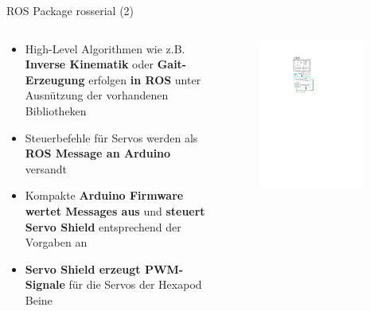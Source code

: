 \documentclass{beamer}
\begin{document}
\begin{frame}{ROS Package rosserial (2)}
\begin{columns}
\begin{column}{0.7\textwidth}
\begin{itemize}
	\item High-Level Algorithmen wie z.B. \textbf{Inverse Kinematik} oder \textbf{Gait-Erzeugung} erfolgen \textbf{in ROS} unter Ausn\"utzung der vorhandenen Bibliotheken
\end{itemize}
\begin{itemize}
	\item Steuerbefehle f\"ur Servos werden als \textbf{ROS Message an Arduino} versandt
\end{itemize}
\begin{itemize}
	\item Kompakte\textbf{ Arduino Firmware wertet Messages aus} und \textbf{steuert Servo Shield} entsprechend der Vorgaben an
\end{itemize}
\begin{itemize}
	\item \textbf{Servo Shield erzeugt PWM-Signale} f\"ur die Servos der Hexapod Beine
\end{itemize}
\end{column}
	\begin{column}{0.3\textwidth}
		\begin{figure}[H]
			\centering
			\includegraphics[width=0.9\textwidth]{./images/rosserial-servo-shield.pdf}
		\end{figure}
	\end{column}
\end{columns}
\end{frame}
\end{document}
